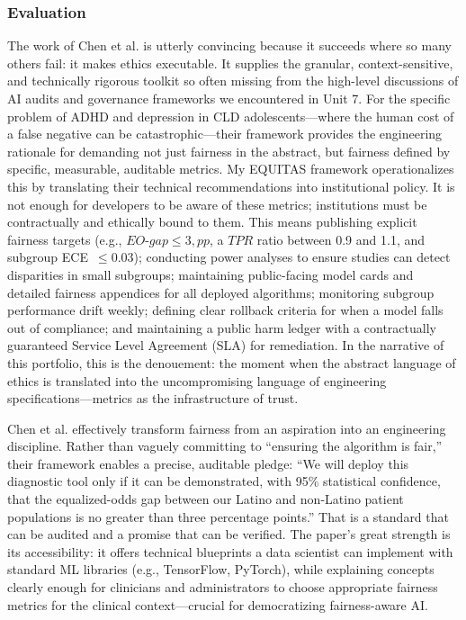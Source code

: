 \documentclass[11pt,twoside]{article}
\DeclareRobustCommand{\EOgap}{EO\text{-}gap\xspace}
\DeclareRobustCommand{\TPR}{TPR\xspace}
\DeclareRobustCommand{\ECE}{ECE\xspace}
\DeclareRobustCommand{\pp}{pp\xspace} %
\begin{document}
\newpage
\vspace{-0.3cm}
\subsubsection*{Evaluation}

\vspace{-0.3cm}
The work of Chen et al. is utterly convincing because it succeeds where so many others fail: it makes ethics executable. It supplies the granular, context-sensitive, and technically rigorous toolkit so often missing from the high-level discussions of AI audits and governance frameworks we encountered in Unit 7. For the specific problem of ADHD and depression in CLD adolescents—where the human cost of a false negative can be catastrophic—their framework provides the engineering rationale for demanding not just fairness in the abstract, but fairness defined by specific, measurable, auditable metrics. My \textsc{EQUITAS} framework operationalizes this by translating their technical recommendations into institutional policy. It is not enough for developers to be aware of these metrics; institutions must be contractually and ethically bound to them. This means publishing explicit fairness targets (e.g., $\EOgap \leq 3,\pp$, a $\TPR$ ratio between 0.9 and 1.1, and subgroup \ECE\ $\le 0.03$); conducting power analyses to ensure studies can detect disparities in small subgroups; maintaining public-facing model cards and detailed fairness appendices for all deployed algorithms; monitoring subgroup performance drift weekly; defining clear rollback criteria for when a model falls out of compliance; and maintaining a public harm ledger with a contractually guaranteed Service Level Agreement (SLA) for remediation. In the narrative of this portfolio, this is the denouement: the moment when the abstract language of ethics is translated into the uncompromising language of engineering specifications—metrics as the infrastructure of trust.

Chen et al. effectively transform fairness from an aspiration into an engineering discipline. Rather than vaguely committing to “ensuring the algorithm is fair,” their framework enables a precise, auditable pledge: “We will deploy this diagnostic tool only if it can be demonstrated, with 95\% statistical confidence, that the equalized-odds gap between our Latino and non-Latino patient populations is no greater than three percentage points.” That is a standard that can be audited and a promise that can be verified. The paper’s great strength is its accessibility: it offers technical blueprints a data scientist can implement with standard ML libraries (e.g., TensorFlow, PyTorch), while explaining concepts clearly enough for clinicians and administrators to choose appropriate fairness metrics for the clinical context—crucial for democratizing fairness-aware AI.
\end{document}
